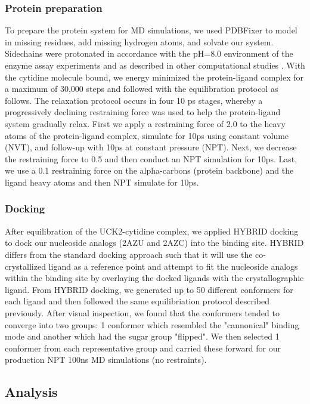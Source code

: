 \documentclass[fleqn,10pt]{wlscirep}
\begin{document}
\subsubsection{Protein preparation}
To prepare the protein system for MD simulations, we used PDBFixer \cite{pdbfixer} to model in missing residues, add missing hydrogen atoms, and solvate our system.
Sidechains were protonated in accordance with the pH=8.0 environment of the enzyme assay experiments \cite{doi:10.1021/bi102054n} and as described in other computational studies \cite{tanaka2016molecular}.
With the cytidine molecule bound, we energy minimized the protein-ligand complex for a maximum of 30,000 steps and followed with the equilibration protocol as follows.
The relaxation protocol occurs in four 10 ps stages, whereby a progressively declining restraining force was used to help the protein-ligand system gradually relax.
First we apply a restraining force of 2.0 to the heavy atoms of the protein-ligand complex, simulate for 10ps using constant volume (NVT), and follow-up with 10ps at constant pressure (NPT).
Next, we decrease the restraining force to 0.5 and then conduct an NPT simulation for 10ps.
Last, we use a 0.1 restraining force on the alpha-carbons (protein backbone) and the ligand heavy atoms and then NPT simulate for 10ps.

\subsubsection{Docking}
After equilibration of the UCK2-cytidine complex, we applied HYBRID docking \cite{mcgann2012fred} to dock our nucleoside analogs (2AZU and 2AZC) into the binding site.
HYBRID differs from the standard docking approach such that it will use the co-crystallized ligand as a reference point and attempt to fit the nucleoside analogs within the binding site by overlaying the docked ligands with the crystallographic ligand.
From HYBRID docking, we generated up to 50 different conformers for each ligand and then followed the same equilibriation protocol described previously.
After visual inspection, we found that the conformers tended to converge into two groups: 1 conformer which resembled the "cannonical" binding mode and another which had the sugar group "flipped".
We then selected 1 conformer from each representative group and carried these forward for our production NPT 100ns MD simulations (no restraints).

\subsection{Analysis}
\end{document}
